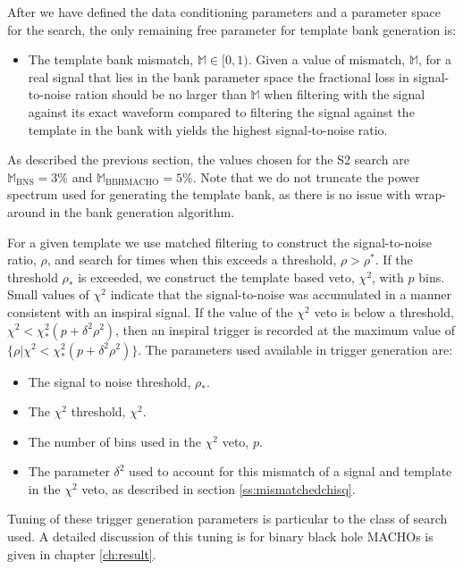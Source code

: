 After we have defined the data conditioning parameters and a parameter space
for the search, the only remaining free parameter for template bank generation
is:
\begin{itemize}
\item The template bank mismatch, $\mathbb{M} \in [0,1)$. Given a value of
mismatch, $\mathbb{M}$, for a real signal that lies in the bank parameter
space the fractional loss in signal-to-noise ration should be no larger than
$\mathbb{M}$ when filtering with the signal against its exact waveform
compared to filtering the signal against the template in the bank with yields
the highest signal-to-noise ratio.
\end{itemize}
As described the previous section, the values chosen for the S2 search are
$\mathbb{M}_\mathrm{BNS} = 3\%$ and $\mathbb{M}_\mathrm{BBHMACHO} = 5\%$.
Note that we do not truncate the power spectrum used for generating the
template bank, as there is no issue with wrap-around in the bank generation
algorithm.

For a given template we use matched filtering to construct the signal-to-noise
ratio, $\rho$, and search for times when this exceeds a threshold, $\rho >
\rho^\ast$. If the threshold $\rho_\ast$ is exceeded, we construct the
template based veto, $\chi^2$, with $p$ bins. Small values of $\chi^2$
indicate that the signal-to-noise was accumulated in a manner consistent with
an inspiral signal. If the value of the $\chi^2$ veto is below a threshold,
$\chi^2 < \chi^2_\ast (p + \delta^2 \rho^2)$, then an inspiral trigger is
recorded at the maximum value of $\{\rho| \chi^2 < \chi^2_\ast (p + \delta^2
\rho^2)\}$.  The parameters used available in trigger generation are:
\begin{itemize}
\item The signal to noise threshold, $\rho_\ast$.

\item The $\chi^2$ threshold, $\chi^2$.

\item The number of bins used in the $\chi^2$ veto, $p$.

\item The parameter $\delta^2$ used to account for this mismatch of a signal
and template in the $\chi^2$ veto, as described in section
\ref{ss:mismatchedchisq}.
\end{itemize}
Tuning of these trigger generation parameters is particular to the class of
search used. A detailed discussion of this tuning is for binary
black hole MACHOs is given in chapter \ref{ch:result}.

